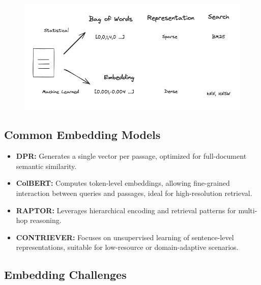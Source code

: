 \documentclass[twocolumn, 10pt]{article}
\begin{document}
\begin{figure}[H]
    \centering
    \includegraphics[width=\linewidth]{fourthimage.jpg}
    \caption{}
    \label{fig:indexing-process}
\end{figure}

\subsection{Common Embedding Models}

\begin{itemize}
    \item \textbf{DPR:} Generates a single vector per passage, optimized for full-document semantic similarity.
    \item \textbf{ColBERT:} Computes token-level embeddings, allowing fine-grained interaction between queries and passages, ideal for high-resolution retrieval.
    \item \textbf{RAPTOR:} Leverages hierarchical encoding and retrieval patterns for multi-hop reasoning.
    \item \textbf{CONTRIEVER:} Focuses on unsupervised learning of sentence-level representations, suitable for low-resource or domain-adaptive scenarios.
\end{itemize}

\subsection{Embedding Challenges}
\end{document}
